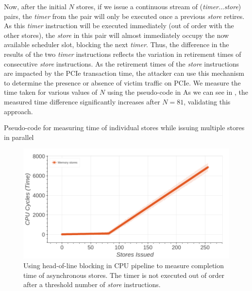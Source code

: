 Now, after the initial $N$ stores, if we issue a continuous stream of (\textit{timer}...\textit{store}) pairs, the \textit{timer} from the pair will only be executed once a previous \textit{store} retires.
As this \textit{timer} instruction will be executed immediately (out of order with the other stores), the \textit{store} in this pair will almost immediately occupy the now available scheduler slot, blocking the next \textit{timer}.
Thus, the difference in the results of the two \textit{timer} instructions reflects the variation in retirement times of consecutive \textit{store} instructions.
As the retirement times of the \textit{store} instructions are impacted by the PCIe transaction time, the attacker can use this mechanism to determine the presence or absence of victim traffic on PCIe.
We measure the time taken for various values of $N$ using the pseudo-code in 
As we can see in , the measured time difference significantly increases after $N = 81$, validating this approach.



\begin{minipage}{\textwidth}

\captionsetup{type=lstlisting}
\caption{Pseudo-code for measuring time of individual stores while issuing multiple stores in parallel}
\label{lst:measuring-time}
\end{minipage}

\begin{figure}[!htb]
    \centering
    \includegraphics[width=\columnwidth]{figures/interconnect-sc/store-ops/measuring_store_time.png}
    \caption{Using head-of-line blocking in CPU pipeline to measure completion time of asynchronous stores.
    The timer is not executed out of order after a threshold number of \textit{store} instructions.}
    \label{fig:measuring-store-time}
\end{figure}

